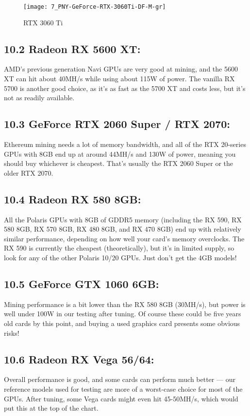 \begin{figure}[h]
	\centering
	\texttt{[image: 7\_PNY-GeForce-RTX-3060Ti-DF-M-gr]}
	\captionsetup{labelformat=empty}
	\caption{RTX 3060 Ti}
\end{figure}

\subsection*{10.2 Radeon RX 5600 XT:} AMD's previous generation Navi GPUs are very good at mining, and the 5600 XT can hit about 40MH/s while using about 115W of power. The vanilla RX 5700 is another good choice, as it's as fast as the 5700 XT and costs less, but it's not as readily available.

\subsection*{10.3 GeForce RTX 2060 Super / RTX 2070:} Ethereum mining needs a lot of memory bandwidth, and all of the RTX 20-series GPUs with 8GB end up at around 44MH/s and 130W of power, meaning you should buy whichever is cheapest. That's usually the RTX 2060 Super or the older RTX 2070.

\subsection*{10.4 Radeon RX 580 8GB:} All the Polaris GPUs with 8GB of GDDR5 memory (including the RX 590, RX 580 8GB, RX 570 8GB, RX 480 8GB, and RX 470 8GB) end up with relatively similar performance, depending on how well your card's memory overclocks. The RX 590 is currently the cheapest (theoretically), but it's in limited supply, so look for any of the other Polaris 10/20 GPUs. Just don't get the 4GB models!

\subsection*{10.5 GeForce GTX 1060 6GB:} Mining performance is a bit lower than the RX 580 8GB (30MH/s), but power is well under 100W in our testing after tuning. Of course these could be five years old cards by this point, and buying a used graphics card presents some obvious risks!

\subsection*{10.6 Radeon RX Vega 56/64:} Overall performance is good, and some cards can perform much better — our reference models used for testing are more of a worst-case choice for most of the GPUs. After tuning, some Vega cards might even hit 45-50MH/s, which would put this at the top of the chart.

